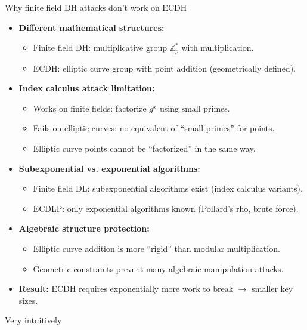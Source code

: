 \documentclass[aspectratio=169, lualatex, handout]{beamer}
\begin{document}
\begin{frame}{Why finite field DH attacks don't work on ECDH}
	\begin{itemize}[<+->]
		\item \textbf{Different mathematical structures:}
		      \begin{itemize}
			      \item Finite field DH: multiplicative group $\mathbb{Z}_p^*$ with multiplication.
			      \item ECDH: elliptic curve group with point addition (geometrically defined).
		      \end{itemize}
		\item \textbf{Index calculus attack limitation:}
		      \begin{itemize}
			      \item Works on finite fields: factorize $g^x$ using small primes.
			      \item Fails on elliptic curves: no equivalent of ``small primes'' for points.
			      \item Elliptic curve points cannot be ``factorized'' in the same way.
		      \end{itemize}
		\item \textbf{Subexponential vs. exponential algorithms:}
		      \begin{itemize}
			      \item Finite field DL: subexponential algorithms exist (index calculus variants).
			      \item ECDLP: only exponential algorithms known (Pollard's rho, brute force).
		      \end{itemize}
		\item \textbf{Algebraic structure protection:}
		      \begin{itemize}
			      \item Elliptic curve addition is more ``rigid'' than modular multiplication.
			      \item Geometric constraints prevent many algebraic manipulation attacks.
		      \end{itemize}
		\item \textbf{Result:} ECDH requires exponentially more work to break $\rightarrow$ smaller key sizes.
	\end{itemize}
\end{frame}

\begin{frame}{Very intuitively}
	\begin{columns}
		\begin{column}{0.5\textwidth}
		\end{column}
		\begin{column}{0.5\textwidth}
		\end{column}
	\end{columns}
\end{frame}
\end{document}
